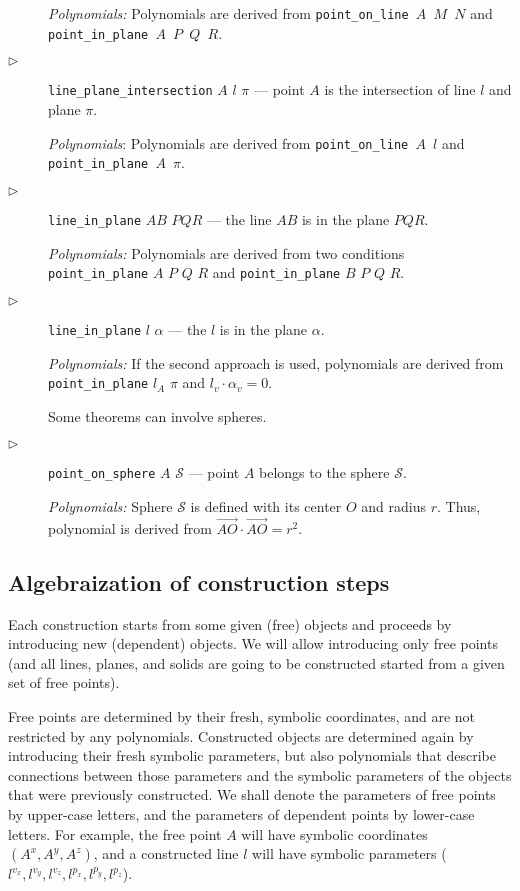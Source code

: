 \documentclass[final,1p,times,authoryear]{elsarticle}
\begin{document}
\begin{description}
  {\em Polynomials:} Polynomials are derived from {\tt point\_on\_line
    $A$ $M$ $N$} and {\tt point\_in\_plane $A$ $P$ $Q$ $R$}.

\item[$\triangleright$] {\tt line\_plane\_intersection} $A$ $l$ $\pi$ ---
  point $A$ is the intersection of line $l$ and plane $\pi$.

  {\em Polynomials}: Polynomials are derived from {\tt point\_on\_line
    $A$ $l$} and {\tt point\_in\_plane $A$ $\pi$}.

\item[$\triangleright$] {\tt line\_in\_plane} $AB$ $PQR$ --- the line
  $AB$ is in the plane $PQR$.

  {\em Polynomials:} Polynomials are derived from two conditions {\tt
    point\_in\_plane} $A$ $P$ $Q$ $R$ and {\tt point\_in\_plane} $B$
  $P$ $Q$ $R$.

\item[$\triangleright$] {\tt line\_in\_plane} $l$ $\alpha$ --- the $l$
  is in the plane $\alpha$.

  {\em Polynomials:} If the second approach is used, polynomials are
  derived from {\tt point\_in\_plane} $l_A$ $\pi$ and
  $l_v \cdot \alpha_v = 0$.

Some theorems can involve spheres. 

\item[$\triangleright$] {\tt point\_on\_sphere} $A$ $\mathcal{S}$
  --- point $A$ belongs to the sphere $\mathcal{S}$.

{\em Polynomials:} Sphere $\mathcal{S}$ is defined with its center $O$
and radius $r$. Thus, polynomial is derived from
$\overrightarrow{AO}\cdot\overrightarrow{AO} = r^2$.

\end{description}


\subsection{Algebraization of construction steps}
Each construction starts from some given (free) objects and proceeds
by introducing new (dependent) objects. We will allow introducing only
free points (and all lines, planes, and solids are going to be
constructed started from a given set of free points).

Free points are determined by their fresh, symbolic coordinates, and
are not restricted by any polynomials. Constructed objects are
determined again by introducing their fresh symbolic parameters, but
also polynomials that describe connections between those parameters
and the symbolic parameters of the objects that were previously
constructed. We shall denote the parameters of free points by
upper-case letters, and the parameters of dependent points by
lower-case letters. For example, the free point $A$ will have symbolic
coordinates $({A}^x, {A}^y, {A}^z)$, and a constructed line $l$ will
have symbolic parameters (${l}^{v_x}, {l}^{v_y}, {l}^{v_z}, {l}^{p_x},
{l}^{p_y}, {l}^{p_z}$).
\end{document}
